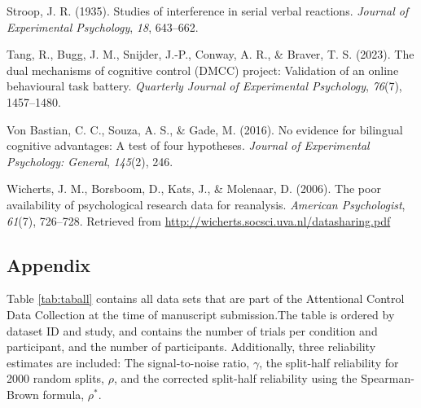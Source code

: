 \documentclass[
  man,floatsintext]{apa6}
\newlength{\cslhangindent}
\newlength{\cslentryspacingunit} %
\newenvironment{CSLReferences}[2] %
 {%
  \setlength{\parindent}{0pt}
  \ifodd #1
  \let\oldpar\par
  \def\par{\hangindent=\cslhangindent\oldpar}
  \fi
  \setlength{\parskip}{#2\cslentryspacingunit}
 }%
 {}
\begin{document}
\begin{CSLReferences}{1}{0}
\leavevmode{}%
Stroop, J. R. (1935). Studies of interference in serial verbal reactions. \emph{Journal of Experimental Psychology}, \emph{18}, 643--662.

\leavevmode{}%
Tang, R., Bugg, J. M., Snijder, J.-P., Conway, A. R., \& Braver, T. S. (2023). The dual mechanisms of cognitive control (DMCC) project: Validation of an online behavioural task battery. \emph{Quarterly Journal of Experimental Psychology}, \emph{76}(7), 1457--1480.

\leavevmode{}%
Von Bastian, C. C., Souza, A. S., \& Gade, M. (2016). No evidence for bilingual cognitive advantages: A test of four hypotheses. \emph{Journal of Experimental Psychology: General}, \emph{145}(2), 246.

\leavevmode{}%
Wicherts, J. M., Borsboom, D., Kats, J., \& Molenaar, D. (2006). The poor availability of psychological research data for reanalysis. \emph{American Psychologist}, \emph{61}(7), 726--728. Retrieved from \url{http://wicherts.socsci.uva.nl/datasharing.pdf}

\end{CSLReferences}

\newpage

\hypertarget{appendix-appendix}{%
\appendix}


\hypertarget{appendix}{%
\subsection{Appendix}\label{appendix}}

Table \ref{tab:taball} contains all data sets that are part of the Attentional Control Data Collection at the time of manuscript submission.The table is ordered by dataset ID and study, and contains the number of trials per condition and participant, and the number of participants. Additionally, three reliability estimates are included: The signal-to-noise ratio, \(\gamma\), the split-half reliability for 2000 random splits, \(\rho\), and the corrected split-half reliability using the Spearman-Brown formula, \(\rho^*\).
\end{document}
